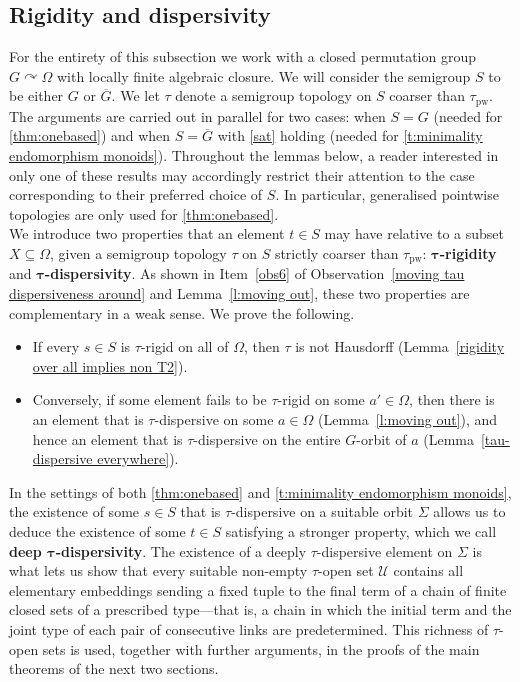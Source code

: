 \documentclass{article}
\theoremstyle{remark}
\theoremstyle{definition}
\def\acts{\curvearrowright}
\newcommand{\U}[0]{\mathbb{U}}
\renewcommand{\U}[0]{\mathcal{U}}
\newcommand{\pw}[0]{\tau_{\mathrm{pw}}}
\begin{document}
{{{{{ \subsection{Rigidity and dispersivity}
   For the entirety of this subsection we work with a closed permutation group $G\acts \Omega$ with locally finite algebraic closure. {We will} consider the semigroup $S$ to be either $G$ or $\overline{G}$.  We let $\tau$ denote a semigroup topology on $S$ coarser than $\pw$.  The arguments are carried out in parallel for two cases: when $S=G$ (needed for \cref{thm:onebased}) and when $S=\overline{G}$ with \ref{sat} holding (needed for \cref{t:minimality endomorphism monoids}).  Throughout the lemmas below, a reader interested in only one of these results may accordingly restrict their attention to the case corresponding to their preferred choice of $S$. In particular, generalised pointwise topologies are only used for \cref{thm:onebased}.\\
  
We introduce two properties that an element $t \in S$ may have relative to a
subset $X \subseteq \Omega$, given a semigroup topology $\tau$ on $S$ strictly
coarser than $\pw$: \textbf{$\bm{\tau}$-rigidity} and \textbf{$\bm{\tau}$-dispersivity}. As
shown in Item~\eqref{obs6} of Observation~\ref{moving tau dispersiveness around} and
Lemma~\ref{l:moving out}, these two properties are complementary in a weak sense.
We prove the following.
\begin{itemize}
  \item If every $s \in S$ is $\tau$-rigid on all of $\Omega$, then $\tau$ is not
   {Hausdorff} (Lemma~\ref{rigidity over all implies non T2}).
  \item Conversely, if some element fails to be $\tau$-rigid on some
    $a' \in \Omega$, then there is an element that is $\tau$-dispersive on some
    $a \in \Omega$ (Lemma~\ref{l:moving out}), and hence an element that is
    $\tau$-dispersive on the entire $G$-orbit of $a$
    (Lemma~\ref{tau-dispersive everywhere}).
\end{itemize}
In the settings of both \cref{thm:onebased} and
\cref{t:minimality endomorphism monoids}, the existence of some $s \in S$ that is
$\tau$-dispersive on a suitable orbit $\Sigma$ allows us to deduce the existence
of some $t \in S$ satisfying a stronger property, which we call
\textbf{deep $\bm{\tau}$-dispersivity}.
The existence of a deeply $\tau$-dispersive element on $\Sigma$ is what lets us
show that every suitable non-empty $\tau$-open set $\U$ contains all elementary
embeddings sending a fixed tuple to the final term of a chain of finite closed
sets of a prescribed type---that is, a chain in which the initial term and the
joint type of each pair of consecutive links are predetermined. This richness of
$\tau$-open sets is used, together with further arguments, in the proofs of the
main theorems of the next two sections.

}}}}}
\end{document}
